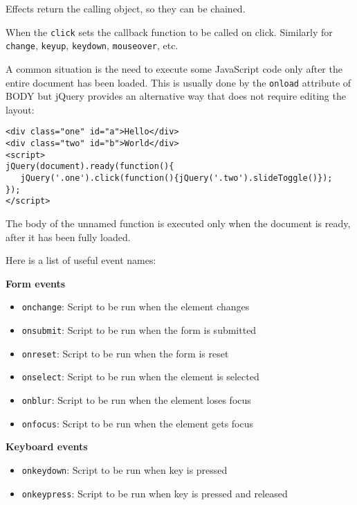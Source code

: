 \documentclass[justified,sixbynine,notoc]{tufte-book}
\def\ft{\small\tt}
\begin{document}
\begin{fullwidth}
Effects return the calling object, so they can be chained.

When the {\ft click} sets the callback function to be called on click. Similarly for {\ft change}, {\ft keyup}, {\ft keydown}, {\ft mouseover}, etc.

A common situation is the need to execute some JavaScript code only after the entire document has been loaded. This is usually done by the {\ft onload} attribute of BODY but jQuery provides an alternative way that does not require editing the layout:
\begin{lstlisting}[keywords={}]
<div class="one" id="a">Hello</div>
<div class="two" id="b">World</div>
<script>
jQuery(document).ready(function(){
   jQuery('.one').click(function(){jQuery('.two').slideToggle()});
});
</script>
\end{lstlisting}

The body of the unnamed function is executed only when the document is ready, after it has been fully loaded.

Here is a list of useful event names:

{\bf Form events}

\begin{itemize}
\item {\ft onchange}:   Script to be run when the element changes

\item {\ft onsubmit}:   Script to be run when the form is submitted

\item {\ft onreset}:    Script to be run when the form is reset

\item {\ft onselect}:   Script to be run when the element is selected

\item {\ft onblur}:     Script to be run when the element loses focus

\item {\ft onfocus}:    Script to be run when the element gets focus
\end{itemize}

{\bf Keyboard events}

\begin{itemize}
\item {\ft onkeydown}:  Script to be run when key is pressed

\item {\ft onkeypress}: Script to be run when key is pressed and released


\end{itemize}
\end{fullwidth}
\end{document}
